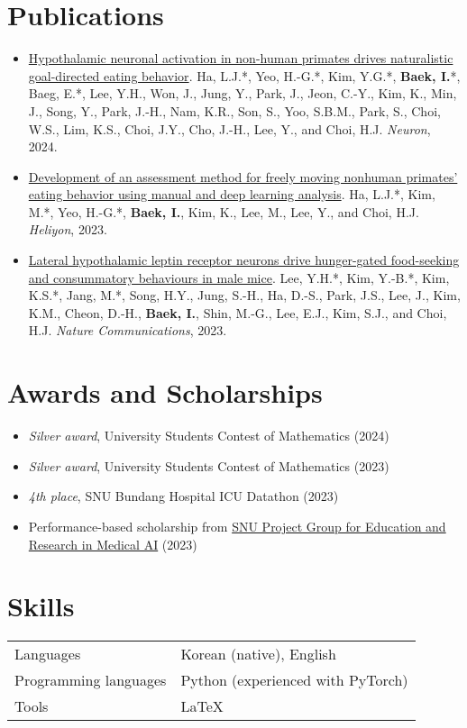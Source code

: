 \documentclass[10pt, a4paper]{article}
\newenvironment{customitemize}
	{\begin{itemize}[leftmargin=*, noitemsep, topsep=0pt, label=$\cdot$]}
	{\end{itemize}}
\begin{document}
\section*{Publications}
\begin{customitemize}
    \item \href{https://doi.org/10.1016/j.neuron.2024.03.029}{\color{sectioncolor} Hypothalamic neuronal activation in non-human primates drives naturalistic goal-directed eating behavior}. Ha, L.J.*, Yeo, H.-G.*, Kim, Y.G.*, \textbf{\color{sectioncolor} Baek, I.}*, Baeg, E.*, Lee, Y.H., Won, J., Jung, Y., Park, J., Jeon, C.-Y., Kim, K., Min, J., Song, Y., Park, J.-H., Nam, K.R., Son, S., Yoo, S.B.M., Park, S., Choi, W.S., Lim, K.S., Choi, J.Y., Cho, J.-H., Lee, Y., and Choi, H.J. \textit{Neuron}, 2024.
    
    \item \href{https://doi.org/10.1016/j.heliyon.2024.e25561}{\color{sectioncolor} Development of an assessment method for freely moving nonhuman primates' eating behavior using manual and deep learning analysis}. Ha, L.J.*, Kim, M.*, Yeo, H.-G.*, \textbf{\color{sectioncolor} Baek, I.}, Kim, K., Lee, M., Lee, Y., and Choi, H.J. \textit{Heliyon}, 2023.
    
    \item \href{https://doi.org/10.1038/s41467-023-37044-4}{\color{sectioncolor} Lateral hypothalamic leptin receptor neurons drive hunger-gated food-seeking and consummatory behaviours in male mice}. Lee, Y.H.*, Kim, Y.-B.*, Kim, K.S.*, Jang, M.*, Song, H.Y., Jung, S.-H., Ha, D.-S., Park, J.S., Lee, J., Kim, K.M., Cheon, D.-H., \textbf{\color{sectioncolor} Baek, I.}, Shin, M.-G., Lee, E.J., Kim, S.J., and Choi, H.J. \textit{Nature Communications}, 2023.
\end{customitemize}
\begin{flushright}
    \vspace{-10pt}{\footnotesize *: Equal contribution}
\end{flushright}

\section*{Awards and Scholarships}
\begin{customitemize}
    \item \textit{Silver award}, University Students Contest of Mathematics (2024)
    \item \textit{Silver award}, University Students Contest of Mathematics (2023)
    \item \textit{4th place}, SNU Bundang Hospital ICU Datathon (2023)
    \item Performance-based scholarship from \href{http://snuaimed.org/}{SNU Project Group for Education and Research in Medical AI} (2023)
\end{customitemize}

\section*{Skills}
\begin{tabular}{@{}ll@{}}
    Languages & Korean (native), English \\
    Programming languages & Python (experienced with PyTorch) \\
    Tools & \LaTeX
\end{tabular}
\end{document}
